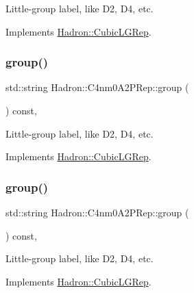 Little-\/group label, like D2, D4, etc. 

Implements \mbox{\hyperlink{structHadron_1_1CubicLGRep_a9bdb14b519a611d21379ed96a3a9eb41}{Hadron\+::\+Cubic\+L\+G\+Rep}}.

\mbox{\label{structHadron_1_1C4nm0A2PRep_a37929ac674c03d89c04c8c8d34f88e02}} 
\subsubsection{\texorpdfstring{group()}{group()}\hspace{0.1cm}{\footnotesize\ttfamily [2/3]}}
{\footnotesize\ttfamily std\+::string Hadron\+::\+C4nm0\+A2\+P\+Rep\+::group (\begin{DoxyParamCaption}{ }\end{DoxyParamCaption}) const\hspace{0.3cm}{\ttfamily [inline]}, {\ttfamily [virtual]}}

Little-\/group label, like D2, D4, etc. 

Implements \mbox{\hyperlink{structHadron_1_1CubicLGRep_a9bdb14b519a611d21379ed96a3a9eb41}{Hadron\+::\+Cubic\+L\+G\+Rep}}.

\mbox{\label{structHadron_1_1C4nm0A2PRep_a37929ac674c03d89c04c8c8d34f88e02}} 
\subsubsection{\texorpdfstring{group()}{group()}\hspace{0.1cm}{\footnotesize\ttfamily [3/3]}}
{\footnotesize\ttfamily std\+::string Hadron\+::\+C4nm0\+A2\+P\+Rep\+::group (\begin{DoxyParamCaption}{ }\end{DoxyParamCaption}) const\hspace{0.3cm}{\ttfamily [inline]}, {\ttfamily [virtual]}}

Little-\/group label, like D2, D4, etc. 

Implements \mbox{\hyperlink{structHadron_1_1CubicLGRep_a9bdb14b519a611d21379ed96a3a9eb41}{Hadron\+::\+Cubic\+L\+G\+Rep}}.

\mbox{\label{structHadron_1_1C4nm0A2PRep_a0a9ce5aff0ffd7d30bc9137951983b54}} 
